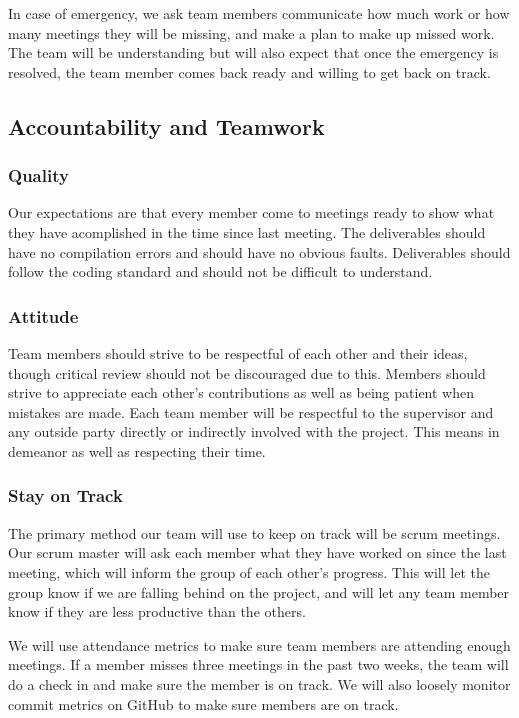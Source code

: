 \documentclass{article}
\begin{document}
In case of emergency, we ask team members communicate how much work or how many meetings they will be missing, and
make a plan to make up missed work. The team will be understanding but will also expect that once the
emergency is resolved, the team member comes back ready and willing to get back on track.

\subsection*{Accountability and Teamwork}

\subsubsection*{Quality} 

Our expectations are that every member come to meetings ready to show what they have acomplished
in the time since last meeting. The deliverables should have no compilation errors and should
have no obvious faults. Deliverables should follow the coding standard and should not be
difficult to understand.

\subsubsection*{Attitude}

Team members should strive to be respectful of each other and their ideas, though critical review should not be discouraged due to this. 
Members should strive to appreciate each other’s contributions as well as being patient when mistakes are made.
Each team member will be respectful to the supervisor and any outside party directly or indirectly involved with the project. This means in demeanor as well as respecting their time.

\subsubsection*{Stay on Track}

The primary method our team will use to keep on track will be scrum meetings.
Our scrum master will ask each member what they have worked on since the last
meeting, which will inform the group of each other's progress. This will let
the group know if we are falling behind on the project, and will let any team
member know if they are less productive than the others.\newline

We will use attendance metrics to make sure team members are attending enough
meetings. If a member misses three meetings in the past two weeks, the team will do a
check in and make sure the member is on track. We will also loosely monitor
commit metrics on GitHub to make sure members are on track. 
\end{document}
